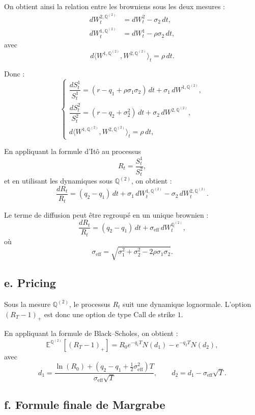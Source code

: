 On obtient ainsi la relation entre les browniens sous les deux mesures :
\[
\boxed{
\begin{aligned}
dW_t^{2,\mathbb Q^{(2)}} &= dW_t^2 - \sigma_2\,dt, \\
dW_t^{1,\mathbb Q^{(2)}} &= dW_t^1 - \rho\sigma_2\,dt,
\end{aligned}
}
\]
avec
\[
d\langle W^{1,\mathbb Q^{(2)}}, W^{2,\mathbb Q^{(2)}} \rangle_t = \rho\,dt.
\]

Donc :
\[
\boxed{
\begin{cases}
\dfrac{dS_t^1}{S_t^1} = (r - q_1 + \rho \sigma_1 \sigma_2)\,dt + \sigma_1\,dW^{1,\mathbb Q^{(2)}}, \\
\dfrac{dS_t^2}{S_t^2} = (r - q_2 + \sigma_2^2)\,dt + \sigma_2\, dW^{2,\mathbb Q^{(2)}},  \\
d\langle W^{1,\mathbb Q^{(2)}}, W^{2,\mathbb Q^{(2)}} \rangle_t = \rho\,dt,
\end{cases}
}
\]


\medskip

En appliquant la formule d’Itô au processus
\[
R_t = \frac{S_t^1}{S_t^2},
\]
et en utilisant les dynamiques sous $\mathbb Q^{(2)}$, on obtient :
\[
\frac{dR_t}{R_t}
= (q_2 - q_1)\,dt
+ \sigma_1\, dW_t^{1,\mathbb Q^{(2)}}
- \sigma_2\, dW_t^{2,\mathbb Q^{(2)}}.
\]

Le terme de diffusion peut être regroupé en un unique brownien :
\[
\frac{dR_t}{R_t}
= (q_2 - q_1)\,dt
+ \sigma_{\text{eff}}\, dW_t^{\mathbb Q^{(2)}},
\]
où
\[
\sigma_{\text{eff}}
= \sqrt{\sigma_1^2 + \sigma_2^2 - 2\rho\sigma_1\sigma_2}.
\]



\subsection*{e. Pricing}

Sous la mesure $\mathbb Q^{(2)}$, le processus $R_t$ suit une dynamique lognormale.
L’option $(R_T - 1)_+$ est donc une option de type Call de strike $1$.

En appliquant la formule de Black--Scholes, on obtient :
\[
\mathbb E^{\mathbb Q^{(2)}}\left[ (R_T - 1)_+ \right]
= R_0 e^{- q_1T} N(d_1) - e^{- q_2T}N(d_2),
\]
avec
\[
d_1 = \frac{\ln(R_0) + (q_2 - q_1 + \tfrac{1}{2}\sigma_{\text{eff}}^2)T}
{\sigma_{\text{eff}}\sqrt{T}},
\qquad
d_2 = d_1 - \sigma_{\text{eff}}\sqrt{T}.
\]

\subsection*{f. Formule finale de Margrabe}

